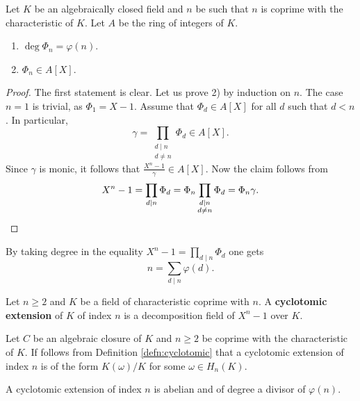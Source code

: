 \begin{proposition}
    Let $K$ be an algebraically closed field and $n$ be
    such that $n$ is coprime with the characteristic of $K$. Let $A$ be
    the ring of integers of $K$. 
    \begin{enumerate}
        \item $\deg\Phi_n=\varphi(n)$.
        \item $\Phi_n\in A[X]$.
    \end{enumerate}
\end{proposition}

\begin{proof}
    The first statement is clear. Let us prove 2) by induction on $n$. The case $n=1$ is
    trivial, as $\Phi_1=X-1$. Assume that $\Phi_d\in A[X]$ for all $d$ such that $d<n$. 
    In particular,
    \[
    \gamma=\prod_{\substack{d\mid n\\d\ne n}}\Phi_d\in A[X].
    \]
    Since $\gamma$ is monic, it follows that 
    $\frac{X^n-1}{\gamma}\in A[X]$. Now the claim follows from 
    \[
    X^n-1=\prod_{d\mid n}\Phi_d=\Phi_n\prod_{\substack{d\mid n\\d\ne n}}\Phi_d=\Phi_n\gamma.\qedhere
    \]
\end{proof}

By taking degree in the equality 
$X^n-1=\prod_{d\mid n}\Phi_d$ 
one gets 
\[
n=\sum_{d\mid n}\varphi(d).
\]

\begin{definition}
\label{defn:cyclotomic}
    Let $n\geq2$ and $K$ be a field of characteristic coprime with $n$. A 
    \textbf{cyclotomic extension} of $K$ of index $n$ is a 
    decomposition field of $X^n-1$ over $K$. 
\end{definition}

Let $C$ be an algebraic closure of $K$ and $n\geq2$ be coprime with the characteristic of $K$. 
If follows from Definition \ref{defn:cyclotomic} 
that a cyclotomic extension of index $n$ is of the form 
$K(\omega)/K$ for some $\omega\in H_n(K)$. 

\begin{proposition}
    A cyclotomic extension of index $n$ is abelian and of degree a divisor of $\varphi(n)$. 
\end{proposition}

